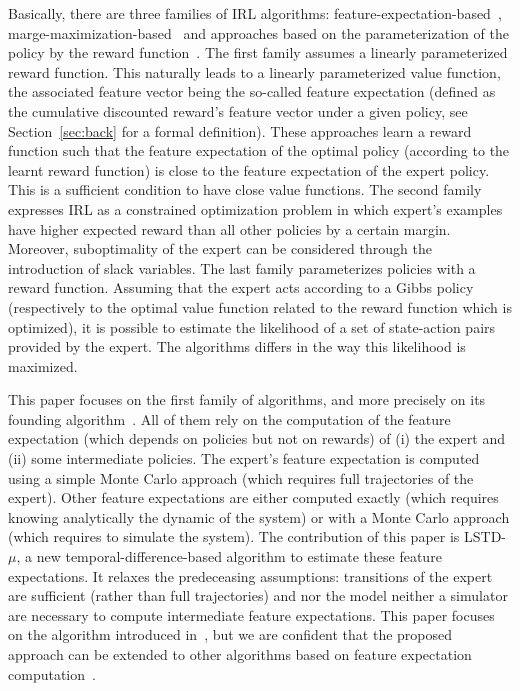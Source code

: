 \documentclass{article}
\begin{document}
Basically, there are three families of IRL algorithms:
feature-expectation-based~\citep{abbeel2004apprenticeship,syed2008game,syed2008apprenticeship,ziebart2008maximum,boularias2011bootstrapping},
marge-maximization-based~\citep{ratliff2006maximum,ratliff2007boosting,ratliff2007imitation,kolter2008hierarchical}
and approaches based on the parameterization of the policy by the
reward function~\citep{Ramachandran2007bayesian,Neu2007apprenticeship}. The first family
assumes a linearly parameterized reward function. This naturally
leads to a linearly parameterized value function, the associated
feature vector being the so-called feature expectation (defined as
the cumulative discounted reward's feature vector under a given
policy, see Section~\ref{sec:back} for a formal definition).
These approaches learn a reward function such that the feature
expectation of the optimal policy (according to the learnt reward
function) is close to the feature expectation of the expert policy.
This is a sufficient condition to have close value functions. The
second family expresses IRL as a constrained optimization problem in
which expert's examples have higher expected reward than all other
policies by a certain margin. Moreover, suboptimality of the expert
can be considered through the introduction of slack variables. The
last family parameterizes policies with a reward function. Assuming
that the expert acts according to a Gibbs policy (respectively to
the optimal value function related to the reward function which is
optimized), it is possible to estimate the likelihood of a set of
state-action pairs provided by the expert. The algorithms differs in
the way this likelihood is maximized.

This paper focuses on the first family of algorithms, and more
precisely on its founding algorithm~\citep{abbeel2004apprenticeship}. All of them
rely on the computation of the feature expectation (which depends on
policies but not on rewards) of (i) the expert and (ii) some
intermediate policies. The expert's feature expectation is computed
using a simple Monte Carlo approach (which requires full
trajectories of the expert). Other feature expectations are either
computed exactly (which requires knowing analytically the dynamic of
the system) or with a Monte Carlo approach (which requires to
simulate the system). The contribution of this paper is LSTD-$\mu$,
a new temporal-difference-based algorithm to estimate these feature
expectations. It relaxes the predeceasing assumptions: transitions
of the expert are sufficient (rather than full trajectories) and nor
the model neither a simulator are necessary to compute intermediate
feature expectations. This paper focuses on the algorithm introduced
in~\citep{abbeel2004apprenticeship}, but we are confident that the proposed
approach can be extended to other algorithms based on feature
expectation computation~\citep{syed2008game,syed2008apprenticeship,ziebart2008maximum}.
\end{document}
